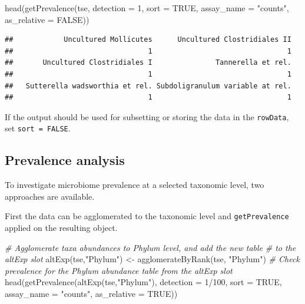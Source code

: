 \documentclass[
]{book}
\newenvironment{Shaded}{\begin{snugshade}}{\end{snugshade}}
\newcommand{\AttributeTok}[1]{\textcolor[rgb]{0.77,0.63,0.00}{#1}}
\newcommand{\CommentTok}[1]{\textcolor[rgb]{0.56,0.35,0.01}{\textit{#1}}}
\newcommand{\ConstantTok}[1]{\textcolor[rgb]{0.00,0.00,0.00}{#1}}
\newcommand{\DecValTok}[1]{\textcolor[rgb]{0.00,0.00,0.81}{#1}}
\newcommand{\FunctionTok}[1]{\textcolor[rgb]{0.00,0.00,0.00}{#1}}
\newcommand{\NormalTok}[1]{#1}
\newcommand{\OtherTok}[1]{\textcolor[rgb]{0.56,0.35,0.01}{#1}}
\newcommand{\SpecialCharTok}[1]{\textcolor[rgb]{0.00,0.00,0.00}{#1}}
\newcommand{\StringTok}[1]{\textcolor[rgb]{0.31,0.60,0.02}{#1}}
\begin{document}
\begin{Shaded}
\begin{Highlighting}[]
\FunctionTok{head}\NormalTok{(}\FunctionTok{getPrevalence}\NormalTok{(tse, }\AttributeTok{detection =} \DecValTok{1}\NormalTok{, }\AttributeTok{sort =} \ConstantTok{TRUE}\NormalTok{, }\AttributeTok{assay\_name =} \StringTok{"counts"}\NormalTok{,}
                   \AttributeTok{as\_relative =} \ConstantTok{FALSE}\NormalTok{))}
\end{Highlighting}
\end{Shaded}

\begin{verbatim}
##            Uncultured Mollicutes      Uncultured Clostridiales II 
##                                1                                1 
##       Uncultured Clostridiales I               Tannerella et rel. 
##                                1                                1 
##   Sutterella wadsworthia et rel. Subdoligranulum variable at rel. 
##                                1                                1
\end{verbatim}

If the output should be used for subsetting or storing the data in the
\texttt{rowData}, set \texttt{sort\ =\ FALSE}.

\hypertarget{prevalence-analysis}{%
\subsection{Prevalence analysis}\label{prevalence-analysis}}

To investigate microbiome prevalence at a selected taxonomic level, two
approaches are available.

First the data can be agglomerated to the taxonomic level and \texttt{getPrevalence}
applied on the resulting object.

\begin{Shaded}
\begin{Highlighting}[]
\CommentTok{\# Agglomerate taxa abundances to Phylum level, and add the new table}
\CommentTok{\# to the altExp slot}
\FunctionTok{altExp}\NormalTok{(tse,}\StringTok{"Phylum"}\NormalTok{) }\OtherTok{\textless{}{-}} \FunctionTok{agglomerateByRank}\NormalTok{(tse, }\StringTok{"Phylum"}\NormalTok{)}
\CommentTok{\# Check prevalence for the Phylum abundance table from the altExp slot}
\FunctionTok{head}\NormalTok{(}\FunctionTok{getPrevalence}\NormalTok{(}\FunctionTok{altExp}\NormalTok{(tse,}\StringTok{"Phylum"}\NormalTok{), }\AttributeTok{detection =} \DecValTok{1}\SpecialCharTok{/}\DecValTok{100}\NormalTok{, }\AttributeTok{sort =} \ConstantTok{TRUE}\NormalTok{,}
                   \AttributeTok{assay\_name =} \StringTok{"counts"}\NormalTok{, }\AttributeTok{as\_relative =} \ConstantTok{TRUE}\NormalTok{))}
\end{Highlighting}
\end{Shaded}
\end{document}
